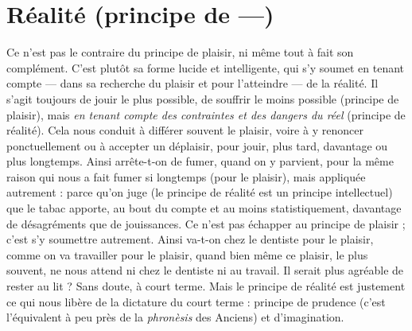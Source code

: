 \section{Réalité (principe de —)}
Ce n’est pas le contraire du principe de plaisir,
ni même tout à fait son complément. C’est
plutôt sa forme lucide et intelligente, qui s’y soumet en tenant compte — dans
sa recherche du plaisir et pour l’atteindre — de la réalité. Il s’agit toujours de
jouir le plus possible, de souffrir le moins possible (principe de plaisir), mais {\it en
tenant compte des contraintes et des dangers du réel} (principe de réalité). Cela
nous conduit à différer souvent le plaisir, voire à y renoncer ponctuellement ou
à accepter un déplaisir, pour jouir, plus tard, davantage ou plus longtemps.
Ainsi arrête-t-on de fumer, quand on y parvient, pour la même raison qui nous
a fait fumer si longtemps (pour le plaisir), mais appliquée autrement : parce
qu'on juge (le principe de réalité est un principe intellectuel) que le tabac
apporte, au bout du compte et au moins statistiquement, davantage de désagréments
que de jouissances. Ce n’est pas échapper au principe de plaisir ; c’est s’y
soumettre autrement. Ainsi va-t-on chez le dentiste pour le plaisir, comme on
va travailler pour le plaisir, quand bien même ce plaisir, le plus souvent, ne
nous attend ni chez le dentiste ni au travail. Il serait plus agréable de rester au
lit ? Sans doute, à court terme. Mais le principe de réalité est justement ce qui
nous libère de la dictature du court terme : principe de prudence (c’est l’équivalent
à peu près de la {\it phronèsis} des Anciens) et d'imagination.


